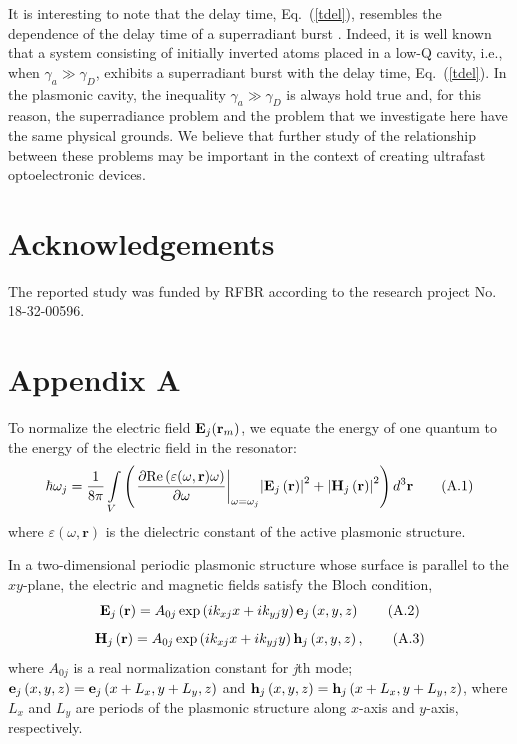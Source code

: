 \documentclass[aps,pra,amsmath,amssymb,onecolumn,superscriptaddress,showpacs,floatfix,]{revtex4-1}
\begin{document}
It is interesting to note that the delay time, Eq.~(\ref{tdel}), resembles the dependence of the delay time of a superradiant burst \cite{gross1982superradiance, andreev1980collective,nefedkin2017badcavitySR}.
Indeed, it is well known \cite{gross1982superradiance, andreev1980collective} that a system consisting of initially inverted atoms placed in a low-Q cavity, i.e., when $\gamma_a \gg \gamma_D$, exhibits a superradiant burst with the delay time, Eq.~(\ref{tdel}). In the plasmonic cavity, the inequality $\gamma_a \gg \gamma_D$ is always hold true and, for this reason, the superradiance problem and the problem that we investigate here have the same physical grounds. We believe that further study of the relationship between these problems may be important in the context of creating ultrafast optoelectronic devices.



\section*{Acknowledgements}

The reported study was funded by RFBR according to the research project No. 18-32-00596.

\section*{Appendix A}
To normalize the electric field ${{\bf{E}}_j}({{\bf{r}}_m})$, we equate the energy of one quantum to the energy of the electric field in the resonator:
\begin{equation}
\hbar {\omega _j} = \frac{1}{{8\pi }}\int\limits_V {\left( {{{\left. {\frac{{\partial {\mathop{\rm Re}\nolimits} \left( {\varepsilon(\omega, \textbf{r}) \omega } \right)}}{{\partial \omega }}} \right|}_{\omega  = {\omega _j}}}{{\left| {{{\bf{E}}_j}\left( {\bf{r}} \right)} \right|}^2} + {{\left| {{{\bf{H}}_j}\left( {\bf{r}} \right)} \right|}^2}} \right){d^3}{\bf{r}}} \tag{A.1}
\end{equation}
where $\varepsilon (\omega, \textbf{r})$  is the dielectric constant of the active plasmonic structure.

In a two-dimensional periodic plasmonic structure whose surface is parallel to the $xy$-plane, the electric and magnetic fields satisfy the Bloch condition,
\begin{equation}
{{\bf{E}}_j}\left( {\bf{r}} \right) = {A_{0j}}\exp \left( {i{k_{xj}}x + i{k_{yj}}y} \right){{\bf{e}}_j}\left( {x,y,z} \right) \tag{A.2}
\end{equation}
\begin{equation}
{{\bf{H}}_j}\left( {\bf{r}} \right) = {A_{0j}}\exp \left( {i{k_{xj}}x + i{k_{yj}}y} \right){{\bf{h}}_j}\left( {x,y,z} \right), \tag{A.3}
\end{equation}
where $A_{0j}$ is a real normalization constant for \textit{j}th mode; ${{\bf{e}}_j}\left( {x,y,z} \right) = {{\bf{e}}_j}\left( {x + {L_x},y + {L_y},z} \right)$  and ${{\bf{h}}_j}\left( {x,y,z} \right) = {{\bf{h}}_j}\left( {x + {L_x},y + {L_y},z} \right)$, where $L_x$ and $L_y$ are periods of the plasmonic structure along $x$-axis and $y$-axis, respectively.
\end{document}
